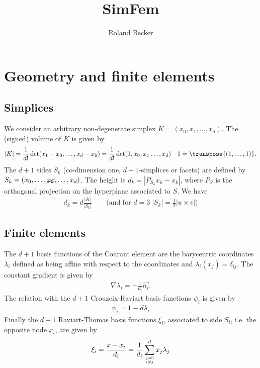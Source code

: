 \documentclass[11pt]{article}
\title{SimFem}
\author{Roland Becker}
\begin{document}
\maketitle
\setcounter{tocdepth}{3}
\tableofcontents
%
%
\section{Geometry and finite elements}\label{sec:}
%
%
\subsection{Simplices}\label{subsec:}
%
We consider an arbitrary non-degenerate simplex $K=(x_0,x_1,\ldots, x_{d})$. The (signed) volume of $K$ is given by
%
\begin{equation}\label{eq:}
|K| = \frac{1}{d!} \det(x_1-x_{0},\ldots, x_{d}-x_{0})= \frac{1}{d!} \det(1,x_{0},x_1\ldots, x_{d})\quad 1=\transpose{(1,\ldots,1)}.
\end{equation}
%
The $d+1$ sides $S_k$ (co-dimension one, $d-1$-simplices or facets) are defined by
$S_k=(x_0,\ldots, \cancel{x_k}, \ldots, x_{d})$. The height is $d_k=|P_{S_k}x_k - x_k|$, where $P_S$ is the orthogonal projection on the hyperplane associated to $S$. We have
%
\begin{align*}
d_k = d\frac{|K|}{|S_k|} \qquad\mbox{(and for $d=3 \; |S_k| = \frac12 |u\times v| $)}
\end{align*}
%
%
\subsection{Finite elements}\label{subsec:}
%
%
The $d+1$ basis functions of the Courant element are the barycentric coordinates 
$\lambda_i$ defined as being affine with respect to the coordinates and $\lambda_i(x_j)=\delta_{ij}$. The constant gradient is given by
%
\begin{align*}
\nabla \lambda_i = - \frac{1}{d_i}\vec{n_i}. 
\end{align*}
%
The relation with the $d+1$ Crouzeix-Raviart basis functions $\psi_i$ is given by 
%
\begin{align*}
\psi_i = 1 - d\lambda_i
\end{align*}
%
Finally the $d+1$ Raviart-Thomas basis functions $\xi_i$, associated to side $S_i$, i.e. the opposite node $x_i$, are given by 
%
\begin{align*}
\xi_i = \frac{x-x_i}{d_i} = \frac{1}{d_i}\sum_{j=0\atop i\ne j}^d x_j \lambda_j
\end{align*}
%
\end{document}
